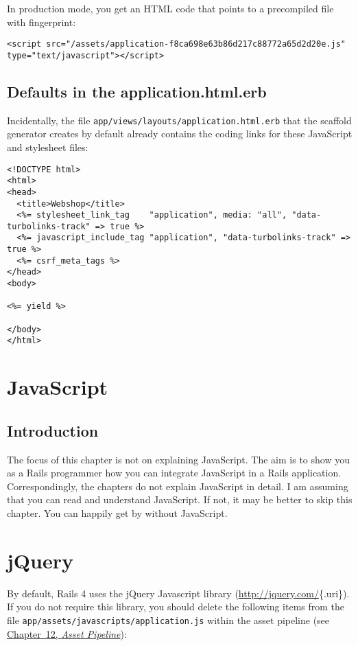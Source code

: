 \documentclass[a4paper]{book}
\newcommand{\chap}[1]{\newpage\thispagestyle{empty}\chapter{#1}\label{chap:\thechapter}}
\begin{document}
In production mode, you get an HTML code that points to a precompiled file with fingerprint:

\begin{shaded}\begin{verbatim}
<script src="/assets/application-f8ca698e63b86d217c88772a65d2d20e.js" type="text/javascript"></script>
\end{verbatim}\end{shaded}

\section{Defaults in the application.html.erb}\label{defaults-in-the-application.html.erb}

Incidentally, the file \texttt{app/views/layouts/application.html.erb} that the scaffold generator creates by default already contains the coding links for these JavaScript and stylesheet files:

\begin{shaded}\begin{verbatim}
<!DOCTYPE html>
<html>
<head>
  <title>Webshop</title>
  <%= stylesheet_link_tag    "application", media: "all", "data-turbolinks-track" => true %>
  <%= javascript_include_tag "application", "data-turbolinks-track" => true %>
  <%= csrf_meta_tags %>
</head>
<body>

<%= yield %>

</body>
</html>
\end{verbatim}\end{shaded}

\chap{JavaScript}\label{javascript}

\section{Introduction}\label{introduction-6}

The focus of this chapter is not on explaining JavaScript. The aim is to show you as a Rails programmer how you can integrate JavaScript in a Rails application. Correspondingly, the chapters do not explain JavaScript in detail. I am assuming that you can read and understand JavaScript. If not, it may be better to skip this chapter. You can happily get by without JavaScript.

\chap{jQuery}\label{jquery}

By default, Rails 4 uses the jQuery Javascript library (\url{http://jquery.com/}\{.uri\}). If you do not require this library, you should delete the following items from the file \texttt{app/assets/javascripts/application.js} within the asset pipeline (see \hyperref[assetux5fpipeline]{Chapter~12, \emph{Asset Pipeline}}):
\end{document}

